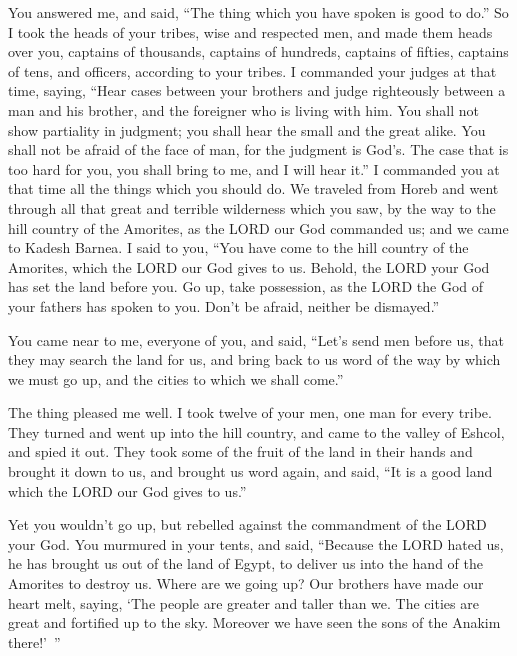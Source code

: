 \myverse{}You answered me, and said, “The thing which you have spoken is
good to do.”
\myverse{}So I took the heads of your tribes, wise and respected men, and made them
heads over you, captains of thousands, captains of hundreds, captains of fifties, captains of tens, and
officers, according to your tribes.
\myverse{}I commanded your judges at that time, saying, “Hear cases between your brothers
and judge righteously between a man and his brother, and the foreigner who is living with him.
\myverse{}You shall not show partiality in judgment; you shall hear the small and the
great alike. You shall not be afraid of the face of man, for the judgment is God’s. The case that is too
hard for you, you shall bring to me, and I will hear it.”
\myverse{}I commanded you at that time all the things which you should do.
\myverse{}We traveled from Horeb and went through all that great and terrible wilderness
which you saw, by the way to the hill country of the Amorites, as the LORD our God commanded us; and we
came to Kadesh Barnea.
\myverse{}I said to you, “You have come to the hill country of the Amorites, which the
LORD our God gives to us.
\myverse{}Behold, the LORD your God has set the land before you. Go up, take possession,
as the LORD the God of your fathers has spoken to you. Don’t be afraid, neither be dismayed.”


\myverse{}You came near to me, everyone of you, and said, “Let’s send men
before us, that they may search the land for us, and bring back to us word of the way by which we must
go up, and the cities to which we shall come.”


\myverse{}The thing pleased me well. I took twelve of your men, one man
for every tribe.
\myverse{}They turned and went up into the hill country, and came to the valley of Eshcol,
and spied it out.
\myverse{}They took some of the fruit of the land in their hands and brought it down
to us, and brought us word again, and said, “It is a good land which the LORD our God gives to us.”


\myverse{}Yet you wouldn’t go up, but rebelled against the commandment
of the LORD your God.
\myverse{}You murmured in your tents, and said, “Because the LORD hated us, he has brought
us out of the land of Egypt, to deliver us into the hand of the Amorites to destroy us.
\myverse{}Where are we going up? Our brothers have made our heart melt, saying, ‘The
people are greater and taller than we. The cities are great and fortified up to the sky. Moreover we have
seen the sons of the Anakim there!’ ”


